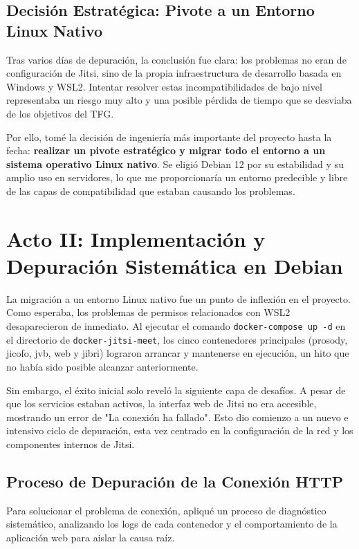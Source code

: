 \subsection{Decisión Estratégica: Pivote a un Entorno Linux Nativo}
Tras varios días de depuración, la conclusión fue clara: los problemas no eran de configuración de Jitsi, sino de la propia infraestructura de desarrollo basada en Windows y WSL2. Intentar resolver estas incompatibilidades de bajo nivel representaba un riesgo muy alto y una posible pérdida de tiempo que se desviaba de los objetivos del TFG.

Por ello, tomé la decisión de ingeniería más importante del proyecto hasta la fecha: \textbf{realizar un pivote estratégico y migrar todo el entorno a un sistema operativo Linux nativo}. Se eligió Debian 12 por su estabilidad y su amplio uso en servidores, lo que me proporcionaría un entorno predecible y libre de las capas de compatibilidad que estaban causando los problemas.

\section{Acto II: Implementación y Depuración Sistemática en Debian}
\label{sec:desarrollo_acto2}
La migración a un entorno Linux nativo fue un punto de inflexión en el proyecto. Como esperaba, los problemas de permisos relacionados con WSL2 desaparecieron de inmediato. Al ejecutar el comando \texttt{docker-compose up -d} en el directorio de \texttt{docker-jitsi-meet}, los cinco contenedores principales (prosody, jicofo, jvb, web y jibri) lograron arrancar y mantenerse en ejecución, un hito que no había sido posible alcanzar anteriormente.

Sin embargo, el éxito inicial solo reveló la siguiente capa de desafíos. A pesar de que los servicios estaban activos, la interfaz web de Jitsi no era accesible, mostrando un error de "La conexión ha fallado". Esto dio comienzo a un nuevo e intensivo ciclo de depuración, esta vez centrado en la configuración de la red y los componentes internos de Jitsi.

\subsection{Proceso de Depuración de la Conexión HTTP}
Para solucionar el problema de conexión, apliqué un proceso de diagnóstico sistemático, analizando los logs de cada contenedor y el comportamiento de la aplicación web para aislar la causa raíz.

